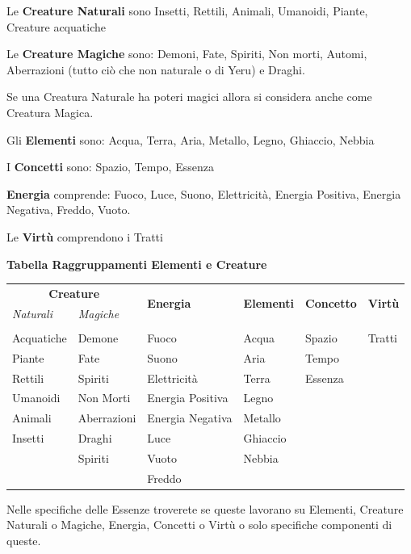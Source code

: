 \documentclass[a4paper,11pt,twoside,openany]{book}
\begin{document}
Le \textbf{Creature Naturali} sono Insetti, Rettili, Animali, Umanoidi, Piante, Creature acquatiche

Le \textbf{Creature Magiche} sono: Demoni, Fate, Spiriti, Non morti, Automi, Aberrazioni (tutto ciò che non naturale o di Yeru) e Draghi.

Se una Creatura Naturale ha poteri magici allora si considera anche come Creatura Magica.

Gli \textbf{Elementi} sono: Acqua, Terra, Aria, Metallo, Legno, Ghiaccio, Nebbia

I \textbf{Concetti} sono: Spazio, Tempo, Essenza

\textbf{Energia} comprende: Fuoco, Luce, Suono, Elettricità, Energia Positiva, Energia Negativa, Freddo, Vuoto.

Le \textbf{Virtù} comprendono i Tratti


\bigskip

\textbf{Tabella Raggruppamenti Elementi e Creature}

\medskip
\begin{tabular}{llllll}
\toprule
	\multicolumn{2}{c}{\textbf{Creature}} &\multirow{2}{*}{\textbf{Energia}}  &\multirow{2}{*}{\textbf{Elementi}}  
	&\multirow{2}{*}{\textbf{Concetto}} &\multirow{2}{*}{\textbf{Virtù}}\\
	\textit{Naturali}& \textit{Magiche} \\
	\hline
	\\
Acquatiche  & Demone   		& Fuoco  			& Acqua 	& Spazio    & Tratti\\
Piante      & Fate     		& Suono  			& Aria   	& Tempo    	& \\
Rettili     & Spiriti   	& Elettricità      	& Terra     & Essenza   & \\
Umanoidi    & Non Morti 	& Energia Positiva 	& Legno     & 			& \\
Animali   	& Aberrazioni   & Energia Negativa 	& Metallo   &  			& \\
Insetti		& Draghi		& Luce				& Ghiaccio 	&			& \\
		    & Spiriti		& Vuoto  			& Nebbia 	&           & \\
			& 			    & Freddo 			&		    &           & \\
\end{tabular}

\bigskip

Nelle specifiche delle Essenze troverete se queste lavorano su Elementi, Creature Naturali o Magiche, Energia, Concetti o Virtù o solo specifiche componenti di queste.
\end{document}
